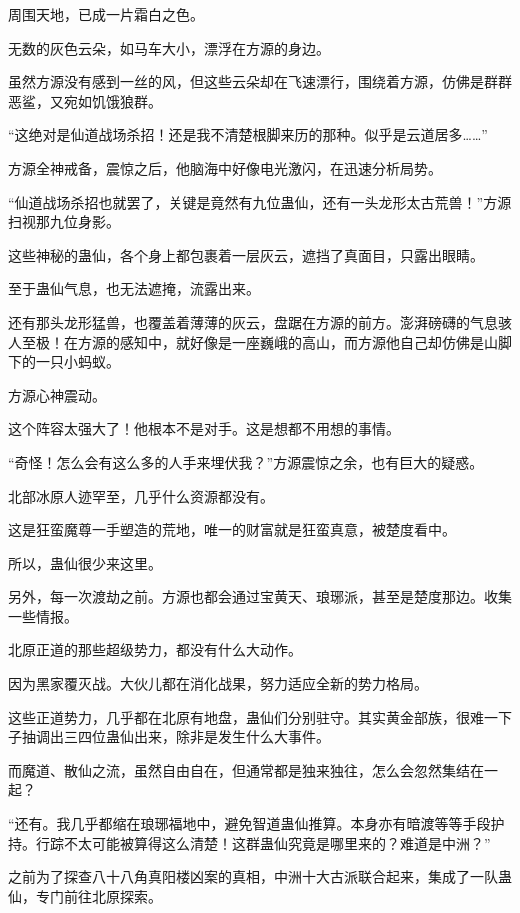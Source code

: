 
\begin{this_body}

周围天地，已成一片霜白之色。

无数的灰色云朵，如马车大小，漂浮在方源的身边。

虽然方源没有感到一丝的风，但这些云朵却在飞速漂行，围绕着方源，仿佛是群群恶鲨，又宛如饥饿狼群。

“这绝对是仙道战场杀招！还是我不清楚根脚来历的那种。似乎是云道居多……”

方源全神戒备，震惊之后，他脑海中好像电光激闪，在迅速分析局势。

“仙道战场杀招也就罢了，关键是竟然有九位蛊仙，还有一头龙形太古荒兽！”方源扫视那九位身影。

这些神秘的蛊仙，各个身上都包裹着一层灰云，遮挡了真面目，只露出眼睛。

至于蛊仙气息，也无法遮掩，流露出来。

还有那头龙形猛兽，也覆盖着薄薄的灰云，盘踞在方源的前方。澎湃磅礴的气息骇人至极！在方源的感知中，就好像是一座巍峨的高山，而方源他自己却仿佛是山脚下的一只小蚂蚁。

方源心神震动。

这个阵容太强大了！他根本不是对手。这是想都不用想的事情。

“奇怪！怎么会有这么多的人手来埋伏我？”方源震惊之余，也有巨大的疑惑。

北部冰原人迹罕至，几乎什么资源都没有。

这是狂蛮魔尊一手塑造的荒地，唯一的财富就是狂蛮真意，被楚度看中。

所以，蛊仙很少来这里。

另外，每一次渡劫之前。方源也都会通过宝黄天、琅琊派，甚至是楚度那边。收集一些情报。

北原正道的那些超级势力，都没有什么大动作。

因为黑家覆灭战。大伙儿都在消化战果，努力适应全新的势力格局。

这些正道势力，几乎都在北原有地盘，蛊仙们分别驻守。其实黄金部族，很难一下子抽调出三四位蛊仙出来，除非是发生什么大事件。

而魔道、散仙之流，虽然自由自在，但通常都是独来独往，怎么会忽然集结在一起？

“还有。我几乎都缩在琅琊福地中，避免智道蛊仙推算。本身亦有暗渡等等手段护持。行踪不太可能被算得这么清楚！这群蛊仙究竟是哪里来的？难道是中洲？”

之前为了探查八十八角真阳楼凶案的真相，中洲十大古派联合起来，集成了一队蛊仙，专门前往北原探索。


\end{this_body}
